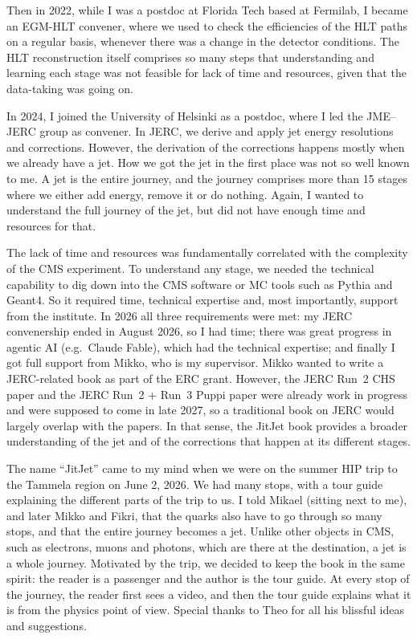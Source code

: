 Then in 2022, while I was a postdoc at Florida Tech based at Fermilab, I became an EGM-HLT convener, where we used to check the efficiencies of the HLT paths on a regular basis, whenever there was a change in the detector conditions. The HLT reconstruction itself comprises so many steps that understanding and learning each stage was not feasible for lack of time and resources, given that the data-taking was going on.

In 2024, I joined the University of Helsinki as a postdoc, where I led the JME--JERC group as convener. In JERC, we derive and apply jet energy resolutions and corrections. However, the derivation of the corrections happens mostly when we already have a jet. How we got the jet in the first place was not so well known to me. A jet is the entire journey, and the journey comprises more than 15 stages where we either add energy, remove it or do nothing. Again, I wanted to understand the full journey of the jet, but did not have enough time and resources for that.

The lack of time and resources was fundamentally correlated with the complexity of the CMS experiment. To understand any stage, we needed the technical capability to dig down into the CMS software or MC tools such as Pythia and Geant4. So it required time, technical expertise and, most importantly, support from the institute. In 2026 all three requirements were met: my JERC convenership ended in August 2026, so I had time; there was great progress in agentic AI (e.g.\ Claude Fable), which had the technical expertise; and finally I got full support from Mikko, who is my supervisor. Mikko wanted to write a JERC-related book as part of the ERC grant. However, the JERC Run~2 CHS paper and the JERC Run~2 + Run~3 Puppi paper were already work in progress and were supposed to come in late 2027, so a traditional book on JERC would largely overlap with the papers. In that sense, the JitJet book provides a broader understanding of the jet and of the corrections that happen at its different stages.

The name ``JitJet'' came to my mind when we were on the summer HIP trip to the Tammela region on June 2, 2026. We had many stops, with a tour guide explaining the different parts of the trip to us. I told Mikael (sitting next to me), and later Mikko and Fikri, that the quarks also have to go through so many stops, and that the entire journey becomes a jet. Unlike other objects in CMS, such as electrons, muons and photons, which are there at the destination, a jet is a whole journey. Motivated by the trip, we decided to keep the book in the same spirit: the reader is a passenger and the author is the tour guide. At every stop of the journey, the reader first sees a video, and then the tour guide explains what it is from the physics point of view. Special thanks to Theo for all his blissful ideas and suggestions.

